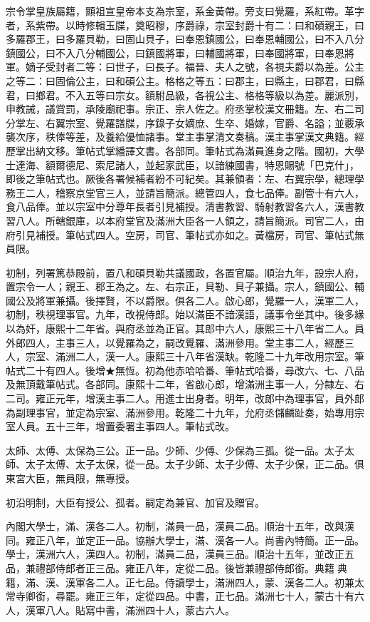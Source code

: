 \begin{pinyinscope}
宗令掌皇族屬籍，顯祖宣皇帝本支為宗室，系金黃帶。旁支曰覺羅，系紅帶。革字者，系紫帶。以時修輯玉牒，奠昭穆，序爵祿，宗室封爵十有二：曰和碩親王，曰多羅郡王，曰多羅貝勒，曰固山貝子，曰奉恩鎮國公，曰奉恩輔國公，曰不入八分鎮國公，曰不入八分輔國公，曰鎮國將軍，曰輔國將軍，曰奉國將軍，曰奉恩將軍。嫡子受封者二等：曰世子，曰長子。福晉、夫人之號，各視夫爵以為差。公主之等二：曰固倫公主，曰和碩公主。格格之等五：曰郡主，曰縣主，曰郡君，曰縣君，曰鄉君。不入五等曰宗女。額駙品級，各視公主、格格等級以為差。麗派別，申教誡，議賞罰，承陵廟祀事。宗正、宗人佐之。府丞掌校漢文冊籍。左、右二司分掌左、右翼宗室、覺羅譜牒，序錄子女嫡庶、生卒、婚嫁，官爵、名謚；並覈承襲次序，秩俸等差，及養給優恤諸事。堂主事掌清文奏稿。漢主事掌漢文典籍。經歷掌出納文移。筆帖式掌繙譯文書。各部同。筆帖式為滿員進身之階。國初，大學士達海、額爾德尼、索尼諸人，並起家武臣，以諳練國書，特恩賜號「巴克什」，即後之筆帖式也。厥後各署候補者紛不可紀矣。其兼領者：左、右翼宗學，總理學務王二人，稽察京堂官三人，並請旨簡派。總管四人，食七品俸。副管十有六人，食八品俸。並以宗室中分尊年長者引見補授。清書教習、騎射教習各六人，漢書教習八人。所轄銀庫，以本府堂官及滿洲大臣各一人領之，請旨簡派。司官二人，由府引見補授。筆帖式四人。空房，司官、筆帖式亦如之。黃檔房，司官、筆帖式無員限。

初制，列署篤恭殿前，置八和碩貝勒共議國政，各置官屬。順治九年，設宗人府，置宗令一人；親王、郡王為之。左、右宗正，貝勒、貝子兼攝。宗人，鎮國公、輔國公及將軍兼攝。後擇賢，不以爵限。俱各二人。啟心郎，覺羅一人，漢軍二人，初制，秩視理事官。九年，改視侍郎。始以滿臣不諳漢語，議事令坐其中。後多緣以為奸，康熙十二年省。與府丞並為正官。其郎中六人，康熙三十八年省二人。員外郎四人，主事三人，以覺羅為之，嗣改覺羅、滿洲參用。堂主事二人，經歷三人，宗室、滿洲二人，漢一人。康熙三十八年省漢缺。乾隆二十九年改用宗室。筆帖式二十有四人。後增★無恆。初為他赤哈哈番、筆帖式哈番，尋改六、七、八品及無頂戴筆帖式。各部同。康熙十二年，省啟心郎，增滿洲主事一人，分隸左、右二司。雍正元年，增漢主事二人。用進士出身者。明年，改郎中為理事官，員外郎為副理事官，並定為宗室、滿洲參用。乾隆二十九年，允府丞儲麟趾奏，始專用宗室人員。五十三年，增置委署主事四人。筆帖式改。

太師、太傅、太保為三公。正一品。少師、少傅、少保為三孤。從一品。太子太師、太子太傅、太子太保，從一品。太子少師、太子少傅、太子少保，正二品。俱東宮大臣，無員限，無專授。

初沿明制，大臣有授公、孤者。嗣定為兼官、加官及贈官。

內閣大學士，滿、漢各二人。初制，滿員一品，漢員二品。順治十五年，改與漢同。雍正八年，並定正一品。協辦大學士，滿、漢各一人。尚書內特簡。正一品。學士，漢洲六人，漢四人。初制，滿員二品，漢員三品。順治十五年，並改正五品，兼禮部侍郎者正三品。雍正八年，定從二品。後皆兼禮部侍郎銜。典籍典籍，滿、漢、漢軍各二人。正七品。侍讀學士，滿洲四人，蒙、漢各二人。初兼太常寺卿銜，尋罷。雍正三年，定從四品。中書，正七品。滿洲七十人，蒙古十有六人，漢軍八人。貼寫中書，滿洲四十人，蒙古六人。


\end{pinyinscope}
